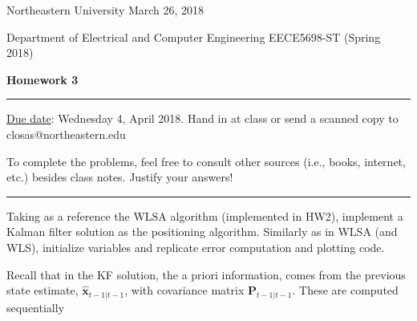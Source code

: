 \documentclass[11pt]{article}
\newcommand{\answer}[1]{\color{blue}{#1}\color{black}}
\begin{document}
\noindent\answer{Gerald LaMountain}

\noindent Northeastern University
\hfill March 26, 2018

\noindent Department of Electrical and Computer Engineering
\hfill EECE5698-ST (Spring 2018)

\noindent {} \hfill \textbf{Homework 3}

\noindent \rule{\linewidth}{1.5pt}

\vspace*{.5cm}

\noindent\underline{Due date}: Wednesday 4, April 2018. Hand in at class or send a scanned copy to closas@northeastern.edu

\noindent To complete the problems, feel free to consult other sources (i.e., books, internet, etc.) besides class notes.  Justify your answers!

\noindent \rule{\linewidth}{1pt}

\vspace*{1cm}

\answer{Note: Questions are marked in black, while responses are marked in blue.}

\vspace*{1cm}


Taking as a reference the WLSA algorithm (implemented in HW2), implement a Kalman filter solution as the positioning algorithm. 
Similarly as in WLSA (and WLS), initialize variables and replicate error computation and plotting code.

Recall that in the KF solution, the a priori information, comes from the previous state estimate, $\hat{\mathbf{x}}_{t-1|t-1}$, with covariance matrix $\mathbf{P}_{t-1|t-1}$. These are computed sequentially
\end{document}
